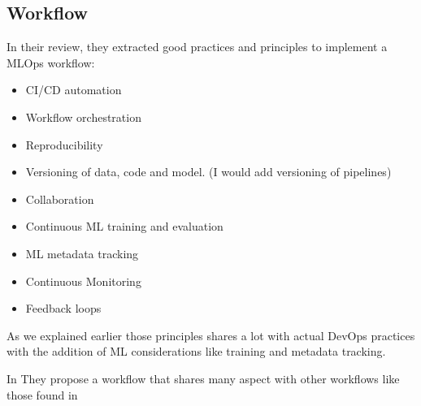 \subsection{Workflow}\label{subsec:workflow}

In their review\cite{Kreuzberger2022MachineLO}, they extracted good practices and principles to implement a MLOps workflow:

\begin{itemize}
    \item CI/CD automation
    \item Workflow orchestration
    \item Reproducibility
    \item Versioning of data, code and model. (I would add versioning of pipelines)
    \item Collaboration
    \item Continuous ML training and evaluation
    \item ML metadata tracking
    \item Continuous Monitoring
    \item Feedback loops
\end{itemize}

As we explained earlier those principles shares a lot with actual DevOps practices with the addition of ML considerations
like training and metadata tracking.

In\cite{9792270} They propose a workflow that shares many aspect with other workflows like those found in\cite{treveil2020introducing,gift2021practical}

